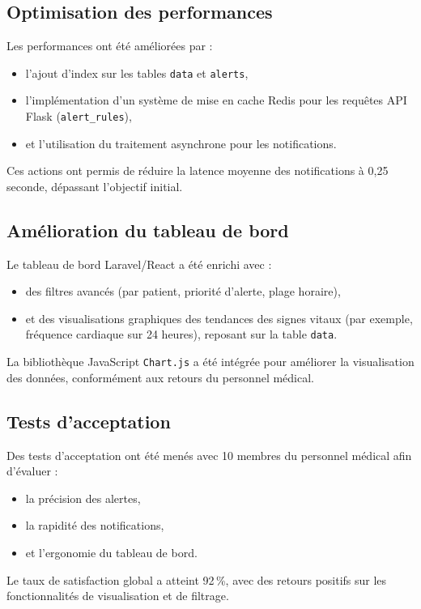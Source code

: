 \subsection{Optimisation des performances}
Les performances ont été améliorées par :
\begin{itemize}
    \item l’ajout d’index sur les tables \texttt{\string data} et \texttt{\string alerts},
    \item l’implémentation d’un système de mise en cache Redis pour les requêtes API Flask (\texttt{\string alert\_rules}),
    \item et l’utilisation du traitement asynchrone pour les notifications.
\end{itemize}
Ces actions ont permis de réduire la latence moyenne des notifications à 0,25 seconde, dépassant l’objectif initial.

\subsection{Amélioration du tableau de bord}
Le tableau de bord Laravel/React a été enrichi avec :
\begin{itemize}
    \item des filtres avancés (par patient, priorité d’alerte, plage horaire),
    \item et des visualisations graphiques des tendances des signes vitaux (par exemple, fréquence cardiaque sur 24 heures), reposant sur la table \texttt{\string data}.
\end{itemize}
La bibliothèque JavaScript \texttt{Chart.js} a été intégrée pour améliorer la visualisation des données, conformément aux retours du personnel médical.

\subsection{Tests d'acceptation}
Des tests d’acceptation ont été menés avec 10 membres du personnel médical afin d’évaluer :
\begin{itemize}
    \item la précision des alertes,
    \item la rapidité des notifications,
    \item et l’ergonomie du tableau de bord.
\end{itemize}
Le taux de satisfaction global a atteint 92\,\%, avec des retours positifs sur les fonctionnalités de visualisation et de filtrage.

